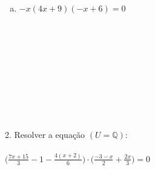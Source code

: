 \documentclass[a4paper,14pt]{article}
\begin{document}
\begin{multicols}{2}
\begin{enumerate}
\begin{enumerate}[a)]
			\item $-x(4x + 9)(-x + 6) = 0$ \\\\\\\\\\\\\\\\\\\\
			\end{enumerate}
		\end{enumerate}
	\end{multicols}
	2. Resolver a equação $(U = \mathbb{Q})$: \\\\
	$\bigg(\frac{7x + 15}{3} - 1 - \frac{4(x + 2)}{6}\bigg) \cdot \bigg(\frac{-3 -x}{2} + \frac{2x}{3}\bigg) = 0$
	\newpage
\end{document}
